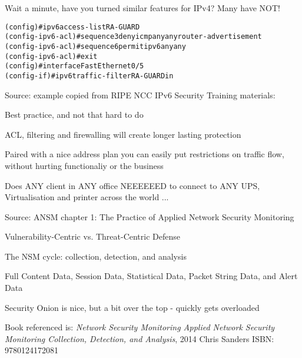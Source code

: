 \documentclass[Screen16to9,17pt]{foils}
\begin{document}
Wait a minute, have you turned similar features for IPv4? Many have NOT! {\myalert}



\begin{alltt}
 (config)#ipv6 access-list RA-GUARD
 (config-ipv6-acl)#sequence 3 deny icmp any any router-advertisement
 (config-ipv6-acl)#sequence 6 permit ipv6 any any
 (config-ipv6-acl)#exit
 (config)#interface FastEthernet0/5
 (config-if)#ipv6 traffic-filter RA-GUARD in
\end{alltt}
Source: example copied from RIPE NCC IPv6 Security Training materials:\\

\begin{list2}
\item Best practice, and not that hard to do
\item ACL, filtering and firewalling will create longer lasting protection
\item Paired with a nice address plan you can easily put restrictions on traffic flow, without hurting functionaliy or the business
\item Does ANY client in ANY office NEEEEEED to connect to ANY UPS, Virtualisation and printer across the world ...
\end{list2}



Source: ANSM chapter 1: The Practice of Applied Network Security Monitoring
\begin{list2}
\item Vulnerability-Centric vs. Threat-Centric Defense
\item The NSM cycle: collection, detection, and analysis
\item Full Content Data, Session Data, Statistical Data, Packet String Data, and Alert Data
\item Security Onion is nice, but a bit over the top - quickly gets overloaded

\item Book referenced is: \emph{Network Security Monitoring
Applied Network Security Monitoring Collection, Detection, and Analysis}, 2014 Chris Sanders ISBN: 9780124172081
\end{list2}
\end{document}
